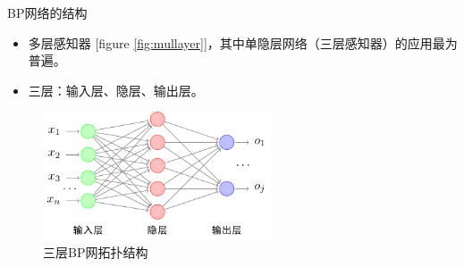 \documentclass[xcolor=svgnames]{beamer}
\begin{document}
\begin{frame}{BP网络的结构}
  \begin{itemize}
  \item \alert{多层感知器} [figure \alert{\ref{fig:mullayer}}]，其中单隐层网络（三层感知器）的应用最为普遍。
  \item 三层：输入层、隐层、输出层。
  \end{itemize}
  \begin{figure}
    \centering
    \includegraphics[width=0.6\textwidth]{fig08.pdf}
    \caption{三层BP网拓扑结构}
    \label{tri}
  \end{figure}
\end{frame}
\end{document}
